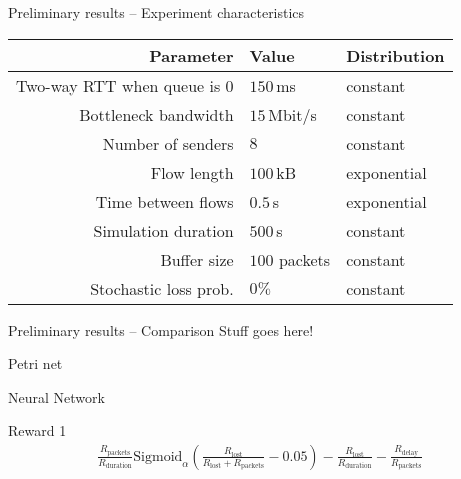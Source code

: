 \documentclass[11pt]{beamer}
\begin{document}
\begin{frame}{Preliminary results -- Experiment characteristics}
\centering
\begin{tabular}{rll}
\toprule
Parameter & Value & Distribution \\
\midrule
Two-way RTT when queue is 0 & $150\,$ms & constant \\
Bottleneck bandwidth & $15\,$Mbit/s & constant \\
Number of senders & $8$ & constant \\
Flow length & $100\,$kB & exponential \\
Time between flows & $0.5\,$s & exponential \\
Simulation duration & $500\,$s & constant \\
Buffer size & $100$ packets & constant \\
Stochastic loss prob. & $0\%$ & constant \\
\bottomrule
\end{tabular}
\end{frame}

\begin{frame}{Preliminary results -- Comparison}
Stuff goes here!

\end{frame}

\begin{frame}{Petri net}



\end{frame}

\begin{frame}{Neural Network}



\end{frame}

\begin{frame}{Reward 1}
\begin{align*}
\frac{R_\text{packets}}{R_\text{duration}}\text{Sigmoid}_\alpha\left(\frac{R_\text{lost}}{R_\text{lost} + R_\text{packets}} - 0.05\right) - \frac{R_\text{lost}}{R_\text{duration}} - \frac{R_\text{delay}}{R_\text{packets}}
\end{align*}
\end{frame}
\end{document}
